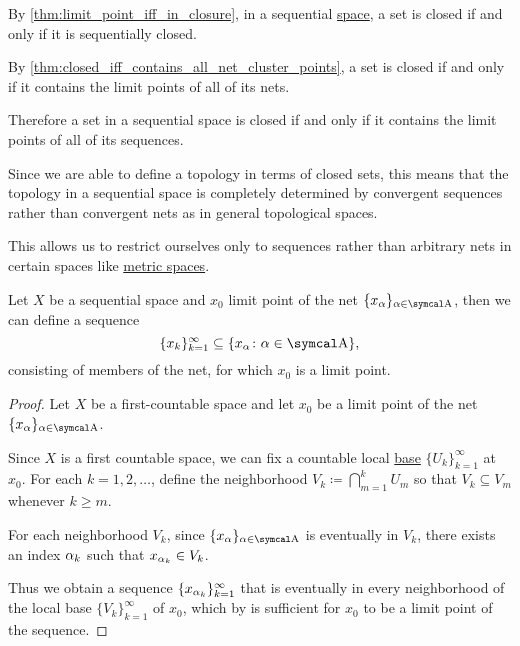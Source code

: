 \begin{remark}\label{remark:sequential_spaces}
  By \cref{thm:limit_point_iff_in_closure}, in a sequential \hyperref[def:sequential_space]{space}, a set is closed if and only if it is sequentially closed.

  By \cref{thm:closed_iff_contains_all_net_cluster_points}, a set is closed if and only if it contains the limit points of all of its nets.

  Therefore a set in a sequential space is closed if and only if it contains the limit points of all of its sequences.

  Since we are able to define a topology in terms of closed sets, this means that the topology in a sequential space is completely determined by convergent sequences rather than convergent nets as in general topological spaces.

  This allows us to restrict ourselves only to sequences rather than arbitrary nets in certain spaces like \hyperref[def:metric_space]{metric spaces}.
\end{remark}

\begin{lemma}\label{thm:sequential_space_convergence}
  Let \( X \) be a sequential space and \( x_0 \) limit point of the net \( \{ x_\al \}_{\al \in \CA} \), then we can define a sequence
  \begin{equation*}
    \{ x_k \}_{k=1}^\infty \subseteq \{ x_\al \colon \al \in \CA \},
  \end{equation*}
  consisting of members of the net, for which \( x_0 \) is a limit point.
\end{lemma}
\begin{proof}
  Let \( X \) be a first-countable space and let \( x_0 \) be a limit point of the net \( \{ x_\al \}_{\al \in \CA} \).

  Since \( X \) is a first countable space, we can fix a countable local \hyperref[def:topological_local_base]{base} \( \{ U_k \}_{k=1}^\infty \) at \( x_0 \). For each \( k = 1, 2, \ldots \), define the neighborhood \( V_k \coloneqq \bigcap_{m=1}^k U_m \) so that \( V_k \subseteq V_m \) whenever \( k \geq m \).

  For each neighborhood \( V_k \), since \( \{ x_\al \}_{\al \in \CA} \) is eventually in \( V_k \), there exists an index \( \alpha_k \) such that \( x_{\alpha_k} \in V_k \).

  Thus we obtain a sequence \( \{ x_{\alpha_k} \}_{k=1}^\infty \) that is eventually in every neighborhood of the local base \( \{ V_k \}_{k=1}^\infty \) of \( x_0 \), which by  is sufficient for \( x_0 \) to be a limit point of the sequence.
\end{proof}

